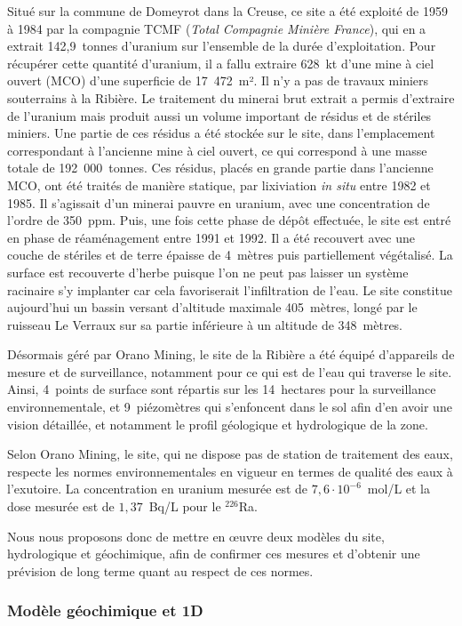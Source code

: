 \documentclass{article}
\begin{document}
Situé sur la commune de Domeyrot dans la Creuse, ce site a été exploité de 1959 à 1984 par la compagnie TCMF (\emph{Total Compagnie Minière France}), qui en a extrait 142,9~tonnes d’uranium sur l’ensemble de la durée d’exploitation. Pour récupérer cette quantité d’uranium, il a fallu extraire 628~kt d’une mine à ciel ouvert (MCO) d’une superficie de 17~472~m². Il n’y a pas de travaux miniers souterrains à la Ribière. Le traitement du minerai brut extrait a permis d'extraire de l'uranium mais produit aussi un volume important de résidus et de stériles miniers. Une partie de ces résidus a été stockée sur le site, dans l’emplacement correspondant à l'ancienne mine à ciel ouvert, ce qui correspond à une masse totale de 192~000~tonnes. Ces résidus, placés en grande partie dans l’ancienne MCO, ont été traités de manière statique, par lixiviation \textit{in situ} entre 1982 et 1985. Il s'agissait d’un minerai pauvre en uranium, avec une concentration de l’ordre de 350~ppm. Puis, une fois cette phase de dépôt effectuée, le site est entré en phase de réaménagement entre 1991 et 1992. Il a été recouvert avec une couche de stériles et de terre épaisse de 4~mètres puis partiellement végétalisé. La surface est recouverte d’herbe puisque l’on ne peut pas laisser un système racinaire s’y implanter car cela favoriserait l'infiltration de l’eau. Le site constitue aujourd'hui un bassin versant d’altitude maximale 405~mètres, longé par le ruisseau Le Verraux sur sa partie inférieure à un altitude de 348~mètres.

Désormais géré par Orano Mining, le site de la Ribière a été équipé d'appareils de mesure et de surveillance, notamment pour ce qui est de l’eau qui traverse le site. Ainsi, 4~points de surface sont répartis sur les 14~hectares pour la surveillance environnementale, et 9~piézomètres qui s’enfoncent dans le sol afin d’en avoir une vision détaillée, et notamment le profil géologique et hydrologique de la zone.

Selon Orano Mining, le site, qui ne dispose pas de station de traitement des eaux, respecte les normes environnementales en vigueur en termes de qualité des eaux à l’exutoire. La concentration en uranium mesurée est de $7,6 \cdot 10^{-6}$~mol/L et la dose mesurée est de $1,37$~Bq/L pour le $^{226}$Ra.

Nous nous proposons donc de mettre en œuvre deux modèles du site, hydrologique et géochimique, afin de confirmer ces mesures et d’obtenir une prévision de long terme quant au respect de ces normes. 

\subsubsection{Modèle géochimique et 1D}
\end{document}
